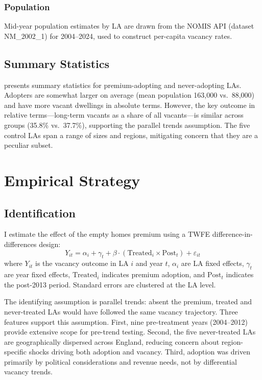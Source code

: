 \documentclass[12pt]{article}
\begin{document}
\subsubsection*{Population} Mid-year population estimates by LA are drawn from the NOMIS API (dataset NM\_2002\_1) for 2004--2024, used to construct per-capita vacancy rates.

\subsection{Summary Statistics}



 presents summary statistics for premium-adopting and never-adopting LAs. Adopters are somewhat larger on average (mean population 163,000 vs.\ 88,000) and have more vacant dwellings in absolute terms. However, the key outcome in relative terms---long-term vacants as a share of all vacants---is similar across groups (35.8\% vs.\ 37.7\%), supporting the parallel trends assumption. The five control LAs span a range of sizes and regions, mitigating concern that they are a peculiar subset.

\section{Empirical Strategy}
\label{sec:strategy}

\subsection{Identification}

I estimate the effect of the empty homes premium using a TWFE difference-in-differences design:
\begin{equation}
\label{eq:twfe}
Y_{it} = \alpha_i + \gamma_t + \beta \cdot (\text{Treated}_i \times \text{Post}_t) + \varepsilon_{it}
\end{equation}
where $Y_{it}$ is the vacancy outcome in LA $i$ and year $t$, $\alpha_i$ are LA fixed effects, $\gamma_t$ are year fixed effects, $\text{Treated}_i$ indicates premium adoption, and $\text{Post}_t$ indicates the post-2013 period. Standard errors are clustered at the LA level.

The identifying assumption is parallel trends: absent the premium, treated and never-treated LAs would have followed the same vacancy trajectory. Three features support this assumption. First, nine pre-treatment years (2004--2012) provide extensive scope for pre-trend testing. Second, the five never-treated LAs are geographically dispersed across England, reducing concern about region-specific shocks driving both adoption and vacancy. Third, adoption was driven primarily by political considerations and revenue needs, not by differential vacancy trends.
\end{document}
